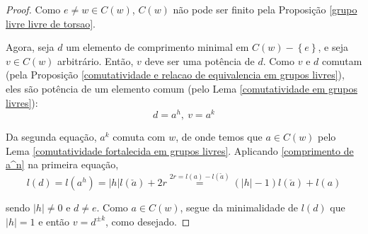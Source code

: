 \documentclass[a4paper,portuguese,11pt,twoside, leqno]{book}
\theoremstyle{definition}
\begin{document}
	\begin{proof}
		Como $e\neq w\in C(w)$, $C(w)$ não pode ser finito pela Proposição \eqref{grupo livre livre de torsao}.
		\par\vspace{0.3cm} Agora, seja $d$ um elemento de comprimento minimal	em $C(w) - \left\{ e \right\}$, e seja $v\in C(w)$ arbitrário. Então, $v$ deve ser uma potência de $d$. Como $v$ e $d$ comutam (pela Proposição \eqref{comutatividade e relacao de equivalencia em grupos livres}), eles são potência de um elemento comum (pelo Lema \eqref{comutatividade em grupos livres}):
		\begin{equation*}
		d = a^h, \ v = a^k
		\end{equation*}
		\par\vspace{0.3cm} Da segunda equação, $a^k$ comuta com $w$, de onde temos que $a\in C(w)$ pelo Lema \eqref{comutatividade fortalecida em grupos livres}. Aplicando \eqref{comprimento de a^n} na primeira equação, 
		\begin{equation*}
		l(d) = l(a^h) = |h|l(\check{a}) + 2r \stackrel{2r = l(a) - l(\check{a})}{=} (|h| - 1)l(\check{a}) + l(a)
		\end{equation*}
		\par\vspace{0.3cm} sendo $|h|\neq 0$ e $d\neq e$. Como $a\in C(w)$, segue da minimalidade de $l(d)$ que $|h| = 1$ e então $v = d^{\pm k}$, como desejado.
	\end{proof}
	
	
\end{document}

